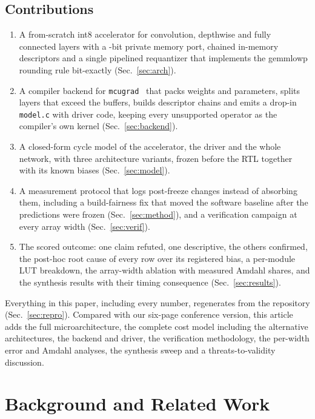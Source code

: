 \documentclass[journal]{IEEEtran}
\begin{document}
\subsection{Contributions}
\begin{enumerate}\setlength{\itemsep}{1pt}
\item A from-scratch int8 accelerator for convolution, depthwise and fully connected layers with a \PortBits-bit private memory port, chained in-memory descriptors and a single pipelined requantizer that implements the gemmlowp rounding rule bit-exactly (Sec.~\ref{sec:arch}).
\item A compiler backend for \texttt{mcugrad}~\cite{mcugrad_repo} that packs weights and parameters, splits layers that exceed the buffers, builds descriptor chains and emits a drop-in \texttt{model.c} with driver code, keeping every unsupported operator as the compiler's own kernel (Sec.~\ref{sec:backend}).
\item A closed-form cycle model of the accelerator, the driver and the whole network, with three architecture variants, frozen before the RTL together with its known biases (Sec.~\ref{sec:model}).
\item A measurement protocol that logs post-freeze changes instead of absorbing them, including a build-fairness fix that moved the software baseline after the predictions were frozen (Sec.~\ref{sec:method}), and a verification campaign at every array width (Sec.~\ref{sec:verif}).
\item The scored outcome: one claim refuted, one descriptive, the others confirmed, the post-hoc root cause of every row over its registered bias, a per-module LUT breakdown, the array-width ablation with measured Amdahl shares, and the synthesis results with their timing consequence (Sec.~\ref{sec:results}).
\end{enumerate}
Everything in this paper, including every number, regenerates from the repository (Sec.~\ref{sec:repro}). Compared with our six-page conference version, this article adds the full microarchitecture, the complete cost model including the alternative architectures, the backend and driver, the verification methodology, the per-width error and Amdahl analyses, the synthesis sweep and a threats-to-validity discussion.

\section{Background and Related Work}\label{sec:related}
\end{document}

